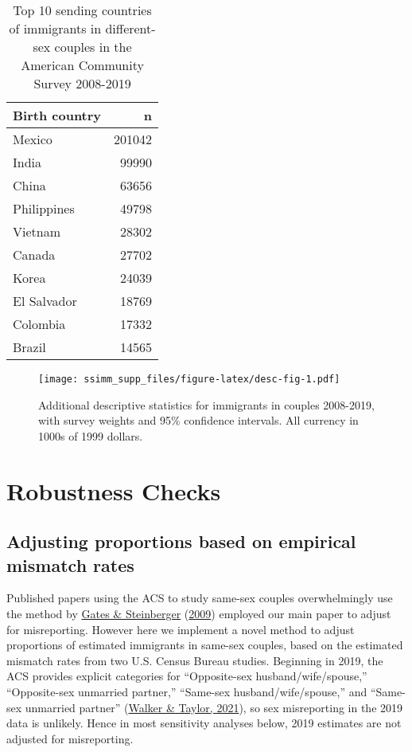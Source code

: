 \documentclass[
  11pt,
]{article}
\begin{document}
\begin{table}[!h]

\caption{\label{tab:desc-top2}Top 10 sending countries of immigrants in different-sex couples in the American Community Survey 2008-2019}
\centering
\begin{tabular}[t]{lr}
\toprule
Birth country & n\\
\midrule
Mexico & 201042\\
India & 99990\\
China & 63656\\
Philippines & 49798\\
Vietnam & 28302\\
\addlinespace
Canada & 27702\\
Korea & 24039\\
El Salvador & 18769\\
Colombia & 17332\\
Brazil & 14565\\
\bottomrule
\end{tabular}
\end{table}

\begin{figure}
\centering
\texttt{[image: ssimm\_supp\_files/figure-latex/desc-fig-1.pdf]}
\caption{\label{fig:desc-fig}Additional descriptive statistics for immigrants in couples 2008-2019, with survey weights and 95\% confidence intervals. All currency in 1000s of 1999 dollars.}
\end{figure}

\newpage

\hypertarget{robustness-checks}{%
\section{Robustness Checks}\label{robustness-checks}}

\hypertarget{adjusting-proportions-based-on-empirical-mismatch-rates}{%
\subsection{Adjusting proportions based on empirical mismatch rates}\label{adjusting-proportions-based-on-empirical-mismatch-rates}}

Published papers using the ACS to study same-sex couples overwhelmingly use the method by \protect\hyperlink{ref-gates_2009}{Gates \& Steinberger} (\protect\hyperlink{ref-gates_2009}{2009}) employed our main paper to adjust for misreporting. However here we implement a novel method to adjust proportions of estimated immigrants in same-sex couples, based on the estimated mismatch rates from two U.S. Census Bureau studies. Beginning in 2019, the ACS provides explicit categories for ``Opposite-sex husband/wife/spouse,'' ``Opposite-sex unmarried partner,'' ``Same-sex husband/wife/spouse,'' and ``Same-sex unmarried partner'' (\protect\hyperlink{ref-walker_2021}{Walker \& Taylor, 2021}), so sex misreporting in the 2019 data is unlikely. Hence in most sensitivity analyses below, 2019 estimates are not adjusted for misreporting.
\end{document}
